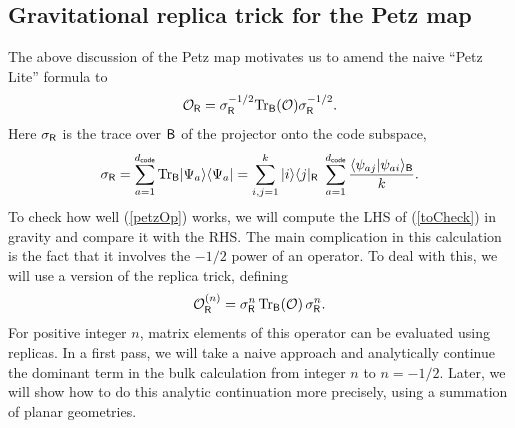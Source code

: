 \documentclass[12pt]{article}
\newcommand{\be}{\begin{equation}}
\newcommand{\ee}{\end{equation}}
\numberwithin{equation}{section}
\def\tr{\text{Tr}}
\begin{document}
\subsection{Gravitational replica trick for the Petz map}\label{sec:gravPetz}
The above discussion of the Petz map motivates us to amend the naive ``Petz Lite'' formula to
\be
\mathcal{O}_{\sf{R}} = \sigma_{\sf{R}}^{-1/2}\tr_{\sf{B}}(\mathcal{O})\sigma_{\sf{R}}^{-1/2}.\label{petzOp}
\ee
Here $\sigma_{\sf{R}}$ is the trace over $\sf{B}$ of the projector onto the code subspace,
\be
\sigma_{\sf{R}} = \sum_{a = 1}^{d_{\sf{code}}}\tr_{\sf{B}} |\Psi_a\rangle\langle \Psi_a| = \sum_{i,j = 1}^k|i\rangle\langle j|_{\sf{R}} \ \sum_{a = 1}^{d_{\sf{code}}}\frac{\langle\psi_{aj}|\psi_{ai}\rangle_{\sf{B}}}{k}.
\ee
To check how well (\ref{petzOp}) works, we will compute the LHS of (\ref{toCheck}) in gravity and compare it with the RHS. The main complication in this calculation is the fact that it involves the $-1/2$ power of an operator. To deal with this, we will use a version of the replica trick, defining
\be
\mathcal{O}^{(n)}_{\sf{R}} = \sigma_{\sf{R}}^{n}\,\tr_{\sf{B}}(\mathcal{O})\,\sigma_{\sf{R}}^{n}.\label{sigmaR}
\ee
For positive integer $n$, matrix elements of this operator can be evaluated using replicas. In a first pass, we will take a naive approach and analytically continue the dominant term in the bulk calculation from integer $n$ to $n = -1/2$. Later, we will show how to do this analytic continuation more precisely, using a summation of planar geometries.
\end{document}
